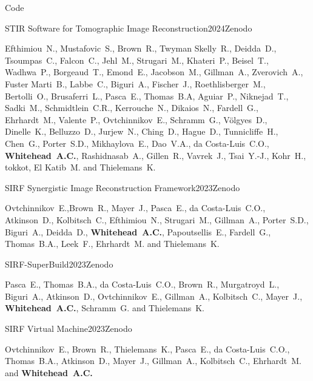 \documentclass{cv}
\begin{document}
    \begin{rSection}{Code}
        \begin{rSubsection}{STIR Software for Tomographic Image Reconstruction}{2024}{Zenodo}{}
            \item Efthimiou~N., Mustafovic~S., Brown~R., Twyman Skelly~R., Deidda~D., Tsoumpas~C., Falcon~C., Jehl~M., Strugari~M., Khateri~P., Beisel~T., Wadhwa~P., Borgeaud~T., Emond~E., Jacobson~M., Gillman~A., Zverovich~A., Fuster Marti~B., Labbe~C., Biguri~A., Fischer~J., Roethlisberger~M., Bertolli~O., Brusaferri~L., Pasca~E., Thomas~B.A, Aguiar~P., Niknejad~T., Sadki~M., Schmidtlein~C.R., Kerrouche~N., Dikaios~N., Fardell~G., Ehrhardt~M., Valente~P., Ovtchinnikov~E., Schramm~G., Völgyes~D., Dinelle~K., Belluzzo~D., Jurjew~N., Ching~D., Hague~D., Tunnicliffe~H., Chen~G., Porter~S.D., Mikhaylova~E., Dao~V.A., da Costa-Luis~C.O., {\bf Whitehead~A.C.}, Rashidnasab~A., Gillen~R., Vavrek~J., Tsai~Y.-J., Kohr~H., tokkot, El Katib~M. and Thielemans~K.
        \end{rSubsection}
        
        \begin{rSubsection}{SIRF Synergistic Image Reconstruction Framework}{2023}{Zenodo}{}
            \item Ovtchinnikov~E.,Brown~R., Mayer~J., Pasca~E., da Costa-Luis~C.O., Atkinson~D., Kolbitsch~C., Efthimiou~N., Strugari~M., Gillman~A., Porter~S.D., Biguri~A., Deidda~D., {\bf Whitehead~A.C.}, Papoutsellis~E., Fardell~G., Thomas~B.A., Leek~F., Ehrhardt~M. and Thielemans~K.
        \end{rSubsection}

        \begin{rSubsection}{SIRF-SuperBuild}{2023}{Zenodo}{}
            \item Pasca~E., Thomas~B.A., da Costa-Luis~C.O., Brown~R., Murgatroyd~L., Biguri~A., Atkinson~D., Ovtchinnikov~E., Gillman~A., Kolbitsch~C., Mayer~J., {\bf Whitehead~A.C.}, Schramm~G. and Thielemans~K.
        \end{rSubsection}
        
        \begin{rSubsection}{SIRF Virtual Machine}{2023}{Zenodo}{}
            \item Ovtchinnikov~E., Brown~R., Thielemans~K., Pasca~E., da Costa-Luis~C.O., Thomas~B.A., Atkinson~D., Mayer~J., Gillman~A., Kolbitsch~C., Ehrhardt~M. and {\bf Whitehead~A.C.}
        \end{rSubsection}
    \end{rSection}
\end{document}

